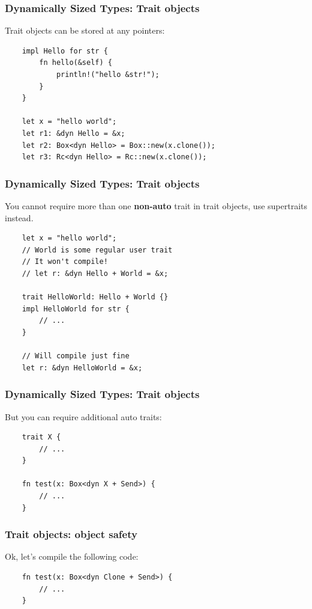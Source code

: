 \documentclass[aspectratio=1610,t]{beamer}
\begin{document}

\begin{frame}[fragile]
\frametitle{Dynamically Sized Types: Trait objects}
Trait objects can be stored at any pointers:

\begin{verbatim}
    impl Hello for str {
        fn hello(&self) {
            println!("hello &str!");
        }
    }

    let x = "hello world";
    let r1: &dyn Hello = &x;
    let r2: Box<dyn Hello> = Box::new(x.clone());
    let r3: Rc<dyn Hello> = Rc::new(x.clone());
\end{verbatim}
\end{frame}


\begin{frame}[fragile]
\frametitle{Dynamically Sized Types: Trait objects}
You cannot require more than one \textbf{non-auto} trait in trait objects, use supertraits instead.

\begin{verbatim}
    let x = "hello world";
    // World is some regular user trait
    // It won't compile!
    // let r: &dyn Hello + World = &x;
    
    trait HelloWorld: Hello + World {}
    impl HelloWorld for str {
        // ...
    }

    // Will compile just fine
    let r: &dyn HelloWorld = &x;
\end{verbatim}
\end{frame}


\begin{frame}[fragile]
\frametitle{Dynamically Sized Types: Trait objects}
But you can require additional auto traits:

\begin{verbatim}
    trait X {
        // ...
    }

    fn test(x: Box<dyn X + Send>) {
        // ...
    }
\end{verbatim}
\end{frame}


\begin{frame}[fragile]
\frametitle{Trait objects: object safety}
Ok, let's compile the following code:

\begin{verbatim}
    fn test(x: Box<dyn Clone + Send>) {
        // ...
    }
\end{verbatim}
\end{frame}
\end{document}
